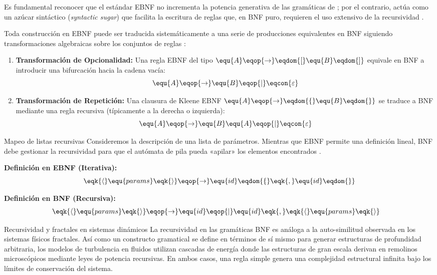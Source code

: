 Es fundamental reconocer que el estándar EBNF no incrementa la potencia generativa de las gramáticas de ; por el contrario, actúa como un azúcar sintáctico (\textit{syntactic sugar}) que facilita la escritura de reglas que, en BNF puro, requieren el uso extensivo de la recursividad \cite{sipser2012introduction,aho2006compilers}. 

Toda construcción en EBNF puede ser traducida sistemáticamente a una serie de producciones equivalentes en BNF siguiendo transformaciones algebraicas sobre los conjuntos de reglas \cite{sipser2012introduction}:

\begin{enumerate}
    \item \textbf{Transformación de Opcionalidad:} Una regla EBNF del tipo $\equ{A} \eqop{\rightarrow} \eqdom{[} \equ{B} \eqdom{]}$ equivale en BNF a introducir una bifurcación hacia la cadena vacía:
    \[ \equ{A} \eqop{\rightarrow} \equ{B} \eqop{\mid} \eqcon{\varepsilon} \]
    
    \item \textbf{Transformación de Repetición:} Una clausura de Kleene EBNF $\equ{A} \eqop{\rightarrow} \eqdom{\{} \equ{B} \eqdom{\}}$ se traduce a BNF mediante una regla recursiva (típicamente a la derecha o izquierda):
    \[ \equ{A} \eqop{\rightarrow} \equ{B}\equ{A} \eqop{\mid} \eqcon{\varepsilon} \]
\end{enumerate}

\begin{ejemplo}{Mapeo de listas recursivas}
Consideremos la descripción de una lista de parámetros. Mientras que EBNF permite una definición lineal, BNF debe gestionar la recursividad para que el autómata de pila pueda «apilar» los elementos encontrados \cite{aho2006compilers}.

\textbf{Definición en EBNF (Iterativa):}
\[ \eqk{\langle} \equ{params} \eqk{\rangle} \eqop{\rightarrow} \equ{id} \eqdom{\{} \eqk{, } \equ{id} \eqdom{\}} \]

\textbf{Definición en BNF (Recursiva):}
\begin{align*}
\eqk{\langle} \equ{params} \eqk{\rangle} &\eqop{\rightarrow} \equ{id} \eqop{\mid} \equ{id} \eqk{, } \eqk{\langle} \equ{params} \eqk{\rangle}
\end{align*}
\end{ejemplo}

\begin{fisicaconexion}{Recursividad y fractales en sistemas dinámicos}
La recursividad en las gramáticas BNF es análoga a la auto-similitud observada en los sistemas físicos fractales. Así como un constructo gramatical se define en términos de sí mismo para generar estructuras de profundidad arbitraria, los modelos de turbulencia en fluidos utilizan cascadas de energía donde las estructuras de gran escala derivan en remolinos microscópicos mediante leyes de potencia recursivas. En ambos casos, una regla simple genera una complejidad estructural infinita bajo los límites de conservación del sistema.
\end{fisicaconexion}

